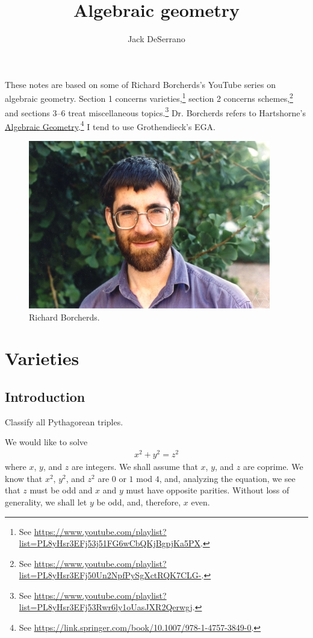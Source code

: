 \documentclass[11pt, oneside,margin=1in]{article}
\title{Algebraic geometry}
\author{Jack DeSerrano}
\begin{document}
\ifams
    \vspace*{\fill}
\fi
\maketitle
These notes are based on some of Richard Borcherds's YouTube series on algebraic geometry. Section 1 concerns varieties,\footnote{See \url{https://www.youtube.com/playlist?list=PL8yHsr3EFj53j51FG6wCbQKjBgpjKa5PX}.} section 2 concerns schemes,\footnote{See \url{https://www.youtube.com/playlist?list=PL8yHsr3EFj50Un2NpfPySgXctRQK7CLG-}.} and sections 3--6 treat miscellaneous topics.\footnote{See \url{https://www.youtube.com/playlist?list=PL8yHsr3EFj53Rwr6ly1oUasJXR2Qerwgj}.} Dr. Borcherds refers to Hartshorne's \underline{Algebraic Geometry}.\footnote{See \url{https://link.springer.com/book/10.1007/978-1-4757-3849-0}.} I tend to use Grothendieck's EGA.
\tableofcontents
\ifams
	\vspace*{\fill}
\fi


\begin{figure}
\begin{center}
\includegraphics[scale=0.8]{images/borcherds}
\caption{Richard Borcherds.}
\end{center}
\end{figure}
\text{}
\newpage
\section{Varieties}
\subsection{Introduction}
\begin{problem}
	Classify all Pythagorean triples.
\end{problem}
We would like to solve
\begin{align*}
	x^2 + y^2 = z^2
\end{align*}
where $x$, $y$, and $z$ are integers. We shall assume that $x$, $y$, and $z$ are coprime. We know that $x^2$, $y^2$, and $z^2$ are $0$ or $1$ mod $4$, and, analyzing the equation, we see that $z$ must be odd and $x$ and $y$ must have opposite parities. Without loss of generality, we shall let $y$ be odd, and, therefore, $x$ even.
\end{document}
